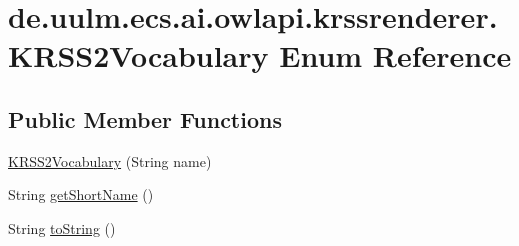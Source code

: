 \hypertarget{enumde_1_1uulm_1_1ecs_1_1ai_1_1owlapi_1_1krssrenderer_1_1_k_r_s_s2_vocabulary}{\section{de.\-uulm.\-ecs.\-ai.\-owlapi.\-krssrenderer.\-K\-R\-S\-S2\-Vocabulary Enum Reference}
\label{enumde_1_1uulm_1_1ecs_1_1ai_1_1owlapi_1_1krssrenderer_1_1_k_r_s_s2_vocabulary}
}
\subsection*{Public Member Functions}
\begin{DoxyCompactItemize}
\item 
\hyperlink{enumde_1_1uulm_1_1ecs_1_1ai_1_1owlapi_1_1krssrenderer_1_1_k_r_s_s2_vocabulary_a7d28f68deb6251075aaf1eee0fa6dc63}{K\-R\-S\-S2\-Vocabulary} (String name)
\item 
String \hyperlink{enumde_1_1uulm_1_1ecs_1_1ai_1_1owlapi_1_1krssrenderer_1_1_k_r_s_s2_vocabulary_ab38c2fa900a3946822c2e7da6d9a4d65}{get\-Short\-Name} ()
\item 
String \hyperlink{enumde_1_1uulm_1_1ecs_1_1ai_1_1owlapi_1_1krssrenderer_1_1_k_r_s_s2_vocabulary_a4c96c130c5acfc859a2da106b1fe9a30}{to\-String} ()
\end{DoxyCompactItemize}
